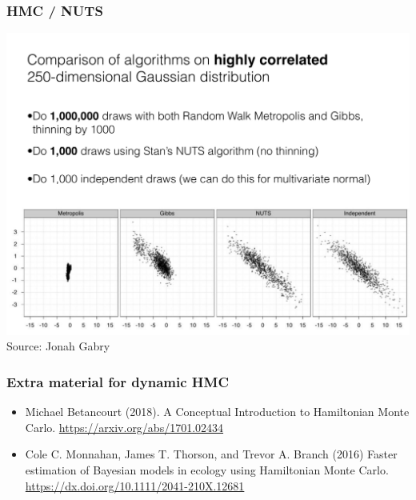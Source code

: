 \documentclass[10pt,handout]{beamer}
\begin{document}
\begin{frame}

\frametitle{ HMC / NUTS}

  \vspace{-.5\baselineskip}
  \includegraphics[width=\textwidth,clip]{figs/N250.pdf}\\
  Source: Jonah Gabry

\end{frame}


\begin{frame}

\frametitle{Extra material for dynamic HMC}

  \begin{itemize}
  \item Michael Betancourt (2018).  A Conceptual Introduction to
    Hamiltonian Monte Carlo. \url{https://arxiv.org/abs/1701.02434}
  \item Cole C. Monnahan, James T. Thorson, and Trevor A. Branch
    (2016) Faster estimation of Bayesian models in ecology using
    Hamiltonian Monte Carlo. \url{https://dx.doi.org/10.1111/2041-210X.12681}
  \end{itemize}

\end{frame}
\end{document}
